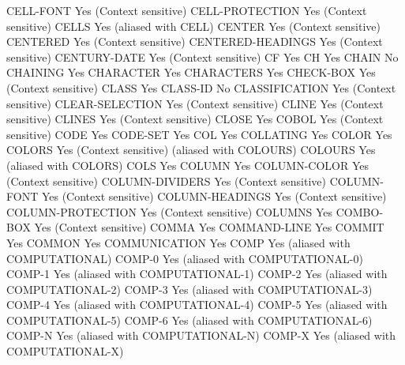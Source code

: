CELL-FONT                       Yes (Context sensitive)
CELL-PROTECTION                 Yes (Context sensitive)
CELLS                           Yes (aliased with CELL)
CENTER                          Yes (Context sensitive)
CENTERED                        Yes (Context sensitive)
CENTERED-HEADINGS               Yes (Context sensitive)
CENTURY-DATE                    Yes (Context sensitive)
CF                              Yes
CH                              Yes
CHAIN                           No
CHAINING                        Yes
CHARACTER                       Yes
CHARACTERS                      Yes
CHECK-BOX                       Yes (Context sensitive)
CLASS                           Yes
CLASS-ID                        No
CLASSIFICATION                  Yes (Context sensitive)
CLEAR-SELECTION                 Yes (Context sensitive)
CLINE                           Yes (Context sensitive)
CLINES                          Yes (Context sensitive)
CLOSE                           Yes
COBOL                           Yes (Context sensitive)
CODE                            Yes
CODE-SET                        Yes
COL                             Yes
COLLATING                       Yes
COLOR                           Yes
COLORS                          Yes (Context sensitive) (aliased with COLOURS)
COLOURS                         Yes (aliased with COLORS)
COLS                            Yes
COLUMN                          Yes
COLUMN-COLOR                    Yes (Context sensitive)
COLUMN-DIVIDERS                 Yes (Context sensitive)
COLUMN-FONT                     Yes (Context sensitive)
COLUMN-HEADINGS                 Yes (Context sensitive)
COLUMN-PROTECTION               Yes (Context sensitive)
COLUMNS                         Yes
COMBO-BOX                       Yes (Context sensitive)
COMMA                           Yes
COMMAND-LINE                    Yes
COMMIT                          Yes
COMMON                          Yes
COMMUNICATION                   Yes
COMP                            Yes (aliased with COMPUTATIONAL)
COMP-0                          Yes (aliased with COMPUTATIONAL-0)
COMP-1                          Yes (aliased with COMPUTATIONAL-1)
COMP-2                          Yes (aliased with COMPUTATIONAL-2)
COMP-3                          Yes (aliased with COMPUTATIONAL-3)
COMP-4                          Yes (aliased with COMPUTATIONAL-4)
COMP-5                          Yes (aliased with COMPUTATIONAL-5)
COMP-6                          Yes (aliased with COMPUTATIONAL-6)
COMP-N                          Yes (aliased with COMPUTATIONAL-N)
COMP-X                          Yes (aliased with COMPUTATIONAL-X)

